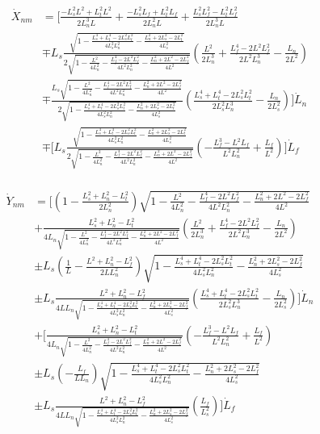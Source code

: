 \documentclass[11pt, landscape]{article}
\begin{document}
\begin{align}
  \dot{X}_{nm} &= \Bigg[\frac{-L_s^2L^2 + L_t^2L^2}{2L_n^3L} + \frac{-L_s^2L_{f} + L_t^2L_{f}}{2L_n^2L} + \frac{L_s^2L_{f}^2 - L_t^2L_{f}^2}{2L_n^3L}\\
  &\mp L_s\frac{\sqrt{1 - \frac{L_s^4 + L_t^4 - 2L_s^2L_t^2}{4L_{s}^2L_{n}^2} - \frac{L_n^2 + 2L_s^2 - 2L_t^2}{4L_s^2}}}{2\sqrt{1 - \frac{L^2}{4L_n^2} - \frac{L_f^4 - 2L^2L_f^2}{4L^2L_n^2} - \frac{L_n^2 + 2L^2 - 2L_f^2}{4L^2}}}\left(\frac{L^2}{2L_n^3} + \frac{L_f^4 - 2L^2L_f^2}{2L^2L_n^3} - \frac{L_n}{2L^2}\right)\\
  &\mp \frac{L_s\sqrt{1 - \frac{L^2}{4L_n^2} - \frac{L_f^4 - 2L^2L_f^2}{4L^2L_n^2} - \frac{L_n^2 + 2L^2 - 2L_f^2}{4L^2}}}{2\sqrt{1 - \frac{L_s^4 + L_t^4 - 2L_s^2L_t^2}{4L_{s}^2L_{n}^2} - \frac{L_n^2 + 2L_s^2 - 2L_t^2}{4L_s^2}}}
  \left(\frac{L_s^4 + L_t^4 - 2L_s^2L_t^2}{2L_{s}^2L_{n}^3} - \frac{L_n}{2L_s^2}\right)\Bigg]\dot{L}_n\\
  &\mp \Bigg[L_s\frac{\sqrt{1 - \frac{L_s^4 + L_t^4 - 2L_s^2L_t^2}{4L_{s}^2L_{n}^2} - \frac{L_n^2 + 2L_s^2 - 2L_t^2}{4L_s^2}}}{2\sqrt{1 - \frac{L^2}{4L_n^2} - \frac{L_f^4 - 2L^2L_f^2}{4L^2L_n^2} - \frac{L_n^2 + 2L^2 - 2L_f^2}{4L^2}}}\left(-\frac{L_f^3 - L^2L_f}{L^2L_n^2} + \frac{L_f}{L^2}\right)\Bigg]\dot{L}_f\\
\end{align}

\begin{align}
  \dot{Y}_{nm} &= \bigg[\left(1 - \frac{L_{s}^2+L_{n}^2-L_{t}^2}{2L_n^2}\right)\sqrt{1 - \frac{L^2}{4L_{n}^2} - \frac{L_f^4 - 2L^2L_f^2}{4L^2L^2_{n}} - \frac{L_n^2 + 2L^2 - 2L_f^2}{4L^2}}\\
    &+ \frac{L_{s}^2+L_{n}^2-L_{t}^2}{4L_{n}\sqrt{1 - \frac{L^2}{4L_{n}^2} - \frac{L_f^4 - 2L^2L_f^2}{4L^2L^2_{n}} - \frac{L_n^2 + 2L^2 - 2L_f^2}{4L^2}}}\left(\frac{L^2}{2L_n^3} + \frac{L_f^4 - 2L^2L_f^2}{2L^2L^3_n} - \frac{L_n}{2L^2}\right)\\
    &\pm L_s\left(\frac{1}{L} - \frac{L^2+L_{n}^2-L_{f}^2}{2LL_n^2}\right)\sqrt{1 - \frac{L_s^4 + L_t^4 - 2L_s^2L_t^2}{4L_s^2L_n^2} - \frac{L_n^2 + 2L_s^2 - 2L_f^2}{4L_s^2}}\\
    &\pm L_s\frac{L^2+L_{n}^2-L_{f}^2}{4LL_{n}\sqrt{1 - \frac{L_s^4 + L_t^4 - 2L_s^2L_t^2}{4L_s^2L_n^2} - \frac{L_n^2 + 2L_s^2 - 2L_f^2}{4L_s^2}}}\left(\frac{L_s^4 + L_t^4 - 2L_s^2L_t^2}{2L_s^2L_n^3} - \frac{L_n}{2L_s^2}\right)
  \bigg]\dot{L}_n\\
  &+\bigg[\frac{L_{s}^2+L_{n}^2-L_{t}^2}{4L_{n}\sqrt{1 - \frac{L^2}{4L_{n}^2} - \frac{L_f^4 - 2L^2L_f^2}{4L^2L^2_{n}} - \frac{L_n^2 + 2L^2 - 2L_f^2}{4L^2}}}\left(-\frac{L_f^3 - L^2L_f}{L^2L^2_{n}} + \frac{L_f}{L^2}\right)\\
    &\pm L_s\left(-\frac{L_f}{LL_{n}}\right)\sqrt{1 - \frac{L_s^4 + L_t^4 - 2L_s^2L_t^2}{4L_s^2L_n^2} - \frac{L_n^2 + 2L_s^2 - 2L_f^2}{4L_s^2}}\\
    &\pm L_s\frac{L^2+L_{n}^2-L_{f}^2}{4LL_{n}\sqrt{1 - \frac{L_s^4 + L_t^4 - 2L_s^2L_t^2}{4L_s^2L_n^2} - \frac{L_n^2 + 2L_s^2 - 2L_f^2}{4L_s^2}}}\left(\frac{L_f}{L_s^2}\right)
  \bigg]\dot{L}_f
\end{align}
\end{document}
